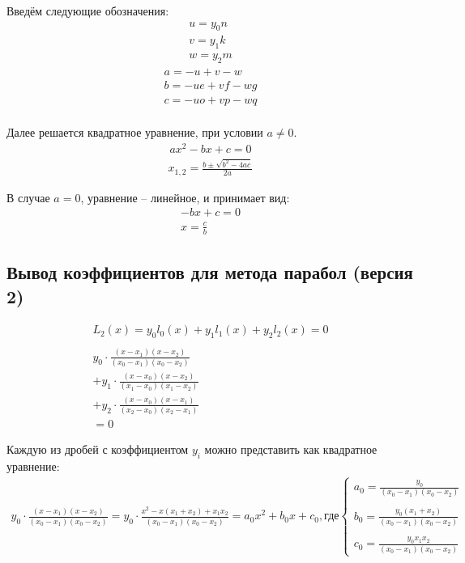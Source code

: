 \documentclass[a4paper]{article}
\begin{document}
Введём следующие обозначения:
\begin{align*}
    u = y_0n \\
    v = y_1k \\
    w = y_2m
\end{align*}
\begin{align*}
    a = -u + v - w \\
    b = -ue + vf - wg \\
    c = -uo + vp - wq \\
\end{align*}

Далее решается квадратное уравнение, при условии $a \neq 0$.
\begin{align*}
    ax^2 - bx + c = 0
\end{align*}
\begin{align*}
    x_{1,2} = \frac{b \pm \sqrt{b^2 - 4ac}}{2a}
\end{align*}

В случае $a = 0$, уравнение -- линейное, и принимает вид:
\begin{align*}
    -bx + c = 0 \\
    x = \frac{c}{b}
\end{align*}

\subsection*{Вывод коэффициентов для метода парабол (версия 2)}

\begin{align*}
    L_2(x) = y_0l_0(x) + y_1l_1(x) + y_2l_2(x) = 0 \\
    \\
    y_0 \cdot \frac{(x - x_1)(x - x_2)}{(x_0 - x_1)(x_0 - x_2)} \\
    + y_1 \cdot \frac{(x - x_0)(x - x_2)}{(x_1 - x_0)(x_1 - x_2)} \\
    + y_2 \cdot \frac{(x - x_0)(x - x_1)}{(x_2 - x_0)(x_2 - x_1)} \\
    = 0
\end{align*}

Каждую из дробей с коэффициентом $y_i$ можно представить как квадратное уравнение:
\begin{align*}
    y_0 \cdot \frac{(x - x_1)(x - x_2)}{(x_0 - x_1)(x_0 - x_2)} = y_0 \cdot \frac{x^2 - x(x_1 + x_2) + x_1x_2}{(x_0 - x_1)(x_0 - x_2)} = a_0x^2 + b_0x + c_0, \text{где}
    \begin{cases}
        a_0 = \displaystyle\frac{y_0}{(x_0 - x_1)(x_0 - x_2)} \\
        \\
        b_0 = \displaystyle\frac{y_0(x_1 + x_2)}{(x_0 - x_1)(x_0 - x_2)} \\
        \\
        c_0 = \displaystyle\frac{y_0x_1x_2}{(x_0 - x_1)(x_0 - x_2)}
    \end{cases}
\end{align*}
\end{document}
